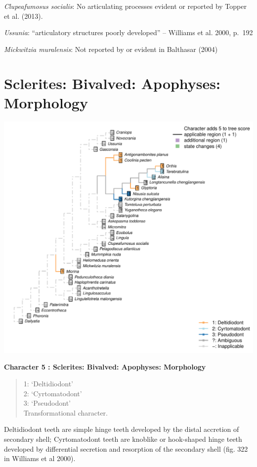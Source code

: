 \documentclass[]{book}
\theoremstyle{definition}
\theoremstyle{definition}
\theoremstyle{definition}
\theoremstyle{remark}
\begin{document}
\emph{Clupeafumosus socialis}: No articulating processes evident or
reported by Topper et al. (2013).

\emph{Ussunia}: ``articulatory structures poorly developed'' -- Williams
et al. 2000, p.~192

\emph{Mickwitzia muralensis}: Not reported by or evident in Balthasar
(2004)

\hypertarget{sclerites-bivalved-apophyses-morphology}{%
\section*{Sclerites: Bivalved: Apophyses:
Morphology}\label{sclerites-bivalved-apophyses-morphology}}

\includegraphics{Brachiopod_phylogeny_files/figure-latex/unnamed-chunk-5-5.pdf}

\textbf{Character 5 : Sclerites: Bivalved: Apophyses: Morphology }

\begin{quote}
1: `Deltidiodont'\\
2: `Cyrtomatodont'\\
3: `Pseudodont'\\
Transformational character.
\end{quote}

Deltidiodont teeth are simple hinge teeth developed by the distal
accretion of secondary shell; Cyrtomatodont teeth are knoblike or
hook-shaped hinge teeth developed by differential secretion and
resorption of the secondary shell (fig. 322 in Williams et al 2000).
\end{document}
